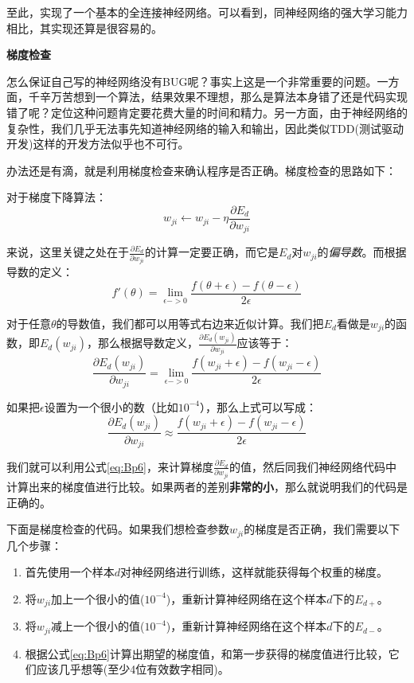 至此，实现了一个基本的全连接神经网络。可以看到，同神经网络的强大学习能力相比，其实现还算是很容易的。

\textbf{梯度检查}

怎么保证自己写的神经网络没有BUG呢？事实上这是一个非常重要的问题。一方面，千辛万苦想到一个算法，结果效果不理想，那么是算法本身错了还是代码实现错了呢？定位这种问题肯定要花费大量的时间和精力。另一方面，由于神经网络的复杂性，我们几乎无法事先知道神经网络的输入和输出，因此类似TDD(测试驱动开发)这样的开发方法似乎也不可行。

办法还是有滴，就是利用梯度检查来确认程序是否正确。梯度检查的思路如下：

对于梯度下降算法：
\[
	w_{ji}\gets w_{ji}-\eta\frac{\partial{E_d}}{\partial{w_{ji}}}
\]

来说，这里关键之处在于\(\frac{\partial{E_d}}{\partial{w_{ji}}}\)的计算一定要正确，而它是\(E_d\)对\(w_{ji}\)的\emph{偏导数}。而根据导数的定义：
\[
	f'(\theta)=\lim_{\epsilon->0}\frac{f(\theta+\epsilon)-f(\theta-\epsilon)}{2\epsilon}
\]

对于任意\(\theta\)的导数值，我们都可以用等式右边来近似计算。我们把\(E_d\)看做是\(w_{ji}\)的函数，即\(E_d(w_{ji})\)，那么根据导数定义，\(\frac{\partial{E_d(w_{ji})}}{\partial{w_{ji}}}\)应该等于：
\[
	\frac{\partial{E_d(w_{ji})}}{\partial{w_{ji}}}=\lim_{\epsilon->0}\frac{f(w_{ji}+\epsilon)-f(w_{ji}-\epsilon)}{2\epsilon}
\]

如果把\(\epsilon\)设置为一个很小的数（比如\(10^{-4}\)），那么上式可以写成：
\begin{equation}
	\label{eq:Bp6}
	\frac{\partial{E_d(w_{ji})}}{\partial{w_{ji}}}\approx\frac{f(w_{ji}+\epsilon)-f(w_{ji}-\epsilon)}{2\epsilon}
\end{equation}


我们就可以利用公式\ref{eq:Bp6}，来计算梯度\(\frac{\partial{E_d}}{\partial{w_{ji}}}\)的值，然后同我们神经网络代码中计算出来的梯度值进行比较。如果两者的差别\textbf{非常的小}，那么就说明我们的代码是正确的。

下面是梯度检查的代码。如果我们想检查参数\(w_{ji}\)的梯度是否正确，我们需要以下几个步骤：

\begin{enumerate}
	\item
	      首先使用一个样本\(d\)对神经网络进行训练，这样就能获得每个权重的梯度。
	\item
	      将\(w_{ji}\)加上一个很小的值(\(10^{-4}\))，重新计算神经网络在这个样本\(d\)下的\(E_{d+}\)。
	\item
	      将\(w_{ji}\)减上一个很小的值(\(10^{-4}\))，重新计算神经网络在这个样本\(d\)下的\(E_{d-}\)。
	\item
	      根据公式\ref{eq:Bp6}计算出期望的梯度值，和第一步获得的梯度值进行比较，它们应该几乎想等(至少4位有效数字相同)。
\end{enumerate}

